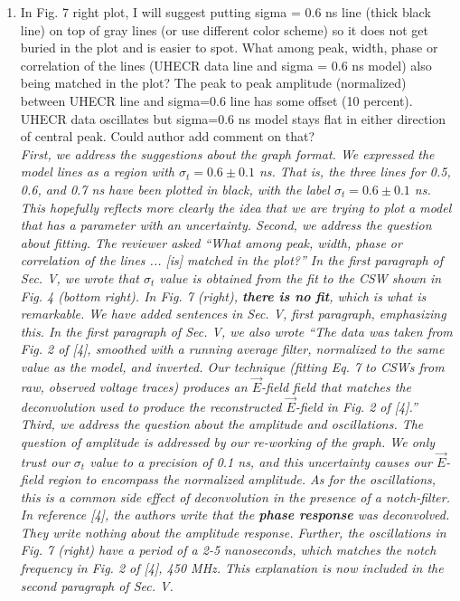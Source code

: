 \documentclass[amsmath,amssymb,aps,prd,10pt,twocolumn,showkeys]{revtex4}
\begin{document}
\begin{enumerate}
\item In Fig. 7 right plot, I will suggest putting sigma = 0.6 ns line (thick black line) on top of gray lines (or use different color scheme) so it does not get buried in the plot and is easier to spot. What among peak, width, phase or correlation of the lines (UHECR data line and sigma = 0.6 ns model) also being matched in the plot? The peak to peak amplitude (normalized) between UHECR line and sigma=0.6 line has some offset (10 percent). UHECR data oscillates but sigma=0.6 ns model stays flat in either direction of central peak. Could author add comment on that? \\ 

\textit{First, we address the suggestions about the graph format.  We expressed the model lines as a region with $\sigma_t = 0.6\pm0.1$ ns.  That is, the three lines for 0.5, 0.6, and 0.7 ns have been plotted in black, with the label $\sigma_t = 0.6\pm0.1$ ns.  This hopefully reflects more clearly the idea that we are trying to plot a model that has a parameter with an uncertainty.  Second, we address the question about fitting.  The reviewer asked ``What among peak, width, phase or correlation of the lines ... [is] matched in the plot?''  In the first paragraph of Sec. V, we wrote that $\sigma_t$ value is obtained from the fit to the CSW shown in Fig. 4 (bottom right).  In Fig. 7 (right), \textbf{there is no fit}, which is what is remarkable. We have added sentences in Sec. V, first paragraph, emphasizing this. In the first paragraph of Sec. V, we also wrote ``The data was taken from Fig. 2 of [4], smoothed with a running average filter, normalized to the same value as the model, and inverted.  Our technique (fitting Eq. 7 to CSWs from raw, observed voltage traces) produces an $\vec{E}$-field field that matches the deconvolution used to produce the reconstructed $\vec{E}$-field in Fig. 2 of [4].''  Third, we address the question about the amplitude and oscillations.  The question of amplitude is addressed by our re-working of the graph.  We only trust our $\sigma_t$ value to a precision of 0.1 ns, and this uncertainty causes our $\vec{E}$-field region to encompass the normalized amplitude.  As for the oscillations, this is a common side effect of deconvolution in the presence of a notch-filter.  In reference [4], the authors write that the \textbf{phase response} was deconvolved.  They write nothing about the amplitude response.  Further, the oscillations in Fig. 7 (right) have a period of a 2-5 nanoseconds, which matches the notch frequency in Fig. 2 of [4], 450 MHz.  This explanation is now included in the second paragraph of Sec. V.}


\end{enumerate}
\end{document}
